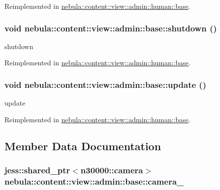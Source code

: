 Reimplemented in \hyperlink{classnebula_1_1content_1_1view_1_1admin_1_1human_1_1base_a9ac7c00ce4bc7f8a8de608ef2092fcd0}{nebula::content::view::admin::human::base}.\hypertarget{classnebula_1_1content_1_1view_1_1admin_1_1base_a4002143535859c70b6cf7fc9c8dd8394}{
\subsubsection[{shutdown}]{\setlength{\rightskip}{0pt plus 5cm}void nebula::content::view::admin::base::shutdown ()}}
\label{classnebula_1_1content_1_1view_1_1admin_1_1base_a4002143535859c70b6cf7fc9c8dd8394}


shutdown 

Reimplemented in \hyperlink{classnebula_1_1content_1_1view_1_1admin_1_1human_1_1base_a0d6c670702266530dd1397debb8e4b8a}{nebula::content::view::admin::human::base}.\hypertarget{classnebula_1_1content_1_1view_1_1admin_1_1base_a6800944fd9dd37f6b15f0a9992bb3477}{
\subsubsection[{update}]{\setlength{\rightskip}{0pt plus 5cm}void nebula::content::view::admin::base::update ()}}
\label{classnebula_1_1content_1_1view_1_1admin_1_1base_a6800944fd9dd37f6b15f0a9992bb3477}


update 

Reimplemented in \hyperlink{classnebula_1_1content_1_1view_1_1admin_1_1human_1_1base_a6ffdf9e2329934997591da7fedb75b6f}{nebula::content::view::admin::human::base}.

\subsection{Member Data Documentation}
\hypertarget{classnebula_1_1content_1_1view_1_1admin_1_1base_ac106d137754b09ea326f6f839d1271a0}{
\subsubsection[{camera\_\-}]{\setlength{\rightskip}{0pt plus 5cm}jess::shared\_\-ptr$<${\bf n30000::camera}$>$ {\bf nebula::content::view::admin::base::camera\_\-}}}
\label{classnebula_1_1content_1_1view_1_1admin_1_1base_ac106d137754b09ea326f6f839d1271a0}


